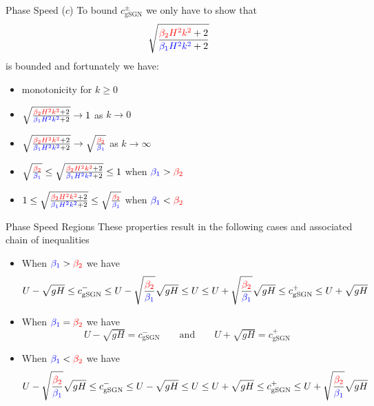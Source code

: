 \documentclass[pdf]{beamer}
\begin{document}
\begin{frame}{Phase Speed ($c$)}
To bound $c^\pm_{\text{gSGN}}$ we only have to show that
\[\sqrt{ \dfrac{{\color{red}\beta_2 H^2 k^2} + 2}{ {\color{blue}\beta_1 H^2 k^2} + 2}}\]
is bounded and fortunately we have:
\begin{itemize}
	\item  monotonicity for $k \ge 0 $
	\item $\sqrt{ \frac{{\color{red}\beta_2 H^2 k^2} + 2}{ {\color{blue}\beta_1 H^2 k^2} + 2}} \rightarrow 1 $ as $k \rightarrow 0$
	\item $\sqrt{ \frac{{\color{red}\beta_2 H^2 k^2} + 2}{ {\color{blue}\beta_1 H^2 k^2} + 2}} \rightarrow \sqrt{\frac{{\color{red}\beta_2 }}{{\color{blue}\beta_1 }}} $ as $k \rightarrow \infty$
		\item  $ \sqrt{\frac{{\color{red}\beta_2 }}{{\color{blue}\beta_1 }}} \le
	\sqrt{ \frac{{\color{red}\beta_2 H^2 k^2} + 2}{ {\color{blue}\beta_1 H^2 k^2} + 2}} \le  1$  when ${\color{blue}\beta_1 } > {\color{red}\beta_2 }$
	\item $1 \le \sqrt{ \frac{{\color{red}\beta_2 H^2 k^2} + 2}{ {\color{blue}\beta_1 H^2 k^2} + 2}} \le  \sqrt{\frac{{\color{red}\beta_2 }}{{\color{blue}\beta_1 }}}$ when ${\color{blue}\beta_1 } < {\color{red}\beta_2 }$ 
\end{itemize}

\end{frame}


\begin{frame}{Phase Speed Regions }
These properties result in the following cases and associated chain of inequalities
\begin{itemize}
\item When ${\color{blue}\beta_1 } > {\color{red}\beta_2 }$ we have
{\footnotesize  \[U - \sqrt{gH}\le   c^-_{\text{gSGN}} \le  U - \sqrt{\frac{{\color{red}\beta_2 }}{{\color{blue}\beta_1 }}} \sqrt{gH} \le U \le  U + \sqrt{\frac{{\color{red}\beta_2 }}{{\color{blue}\beta_1 }}} \sqrt{gH} \le c^+_{\text{gSGN}} \le U + \sqrt{gH} \]}
\item When ${\color{blue}\beta_1 } = {\color{red}\beta_2 }$ we have
\[U - \sqrt{gH} =   c^-_{\text{gSGN}} \quad \quad \text{and} \quad \quad  U + \sqrt{gH} =   c^+_{\text{gSGN}}\]
\item When ${\color{blue}\beta_1 } < {\color{red}\beta_2 }$ we have
{\footnotesize \[U - \sqrt{\frac{{\color{red}\beta_2 }}{{\color{blue}\beta_1 }}} \sqrt{gH}\le   c^-_{\text{gSGN}} \le  U - \sqrt{gH} \le U \le  U + \sqrt{gH} \le c^+_{\text{gSGN}} \le U +  \sqrt{\frac{{\color{red}\beta_2 }}{{\color{blue}\beta_1 }}} \sqrt{gH}  \]}
\end{itemize}
\end{frame}
\end{document}
